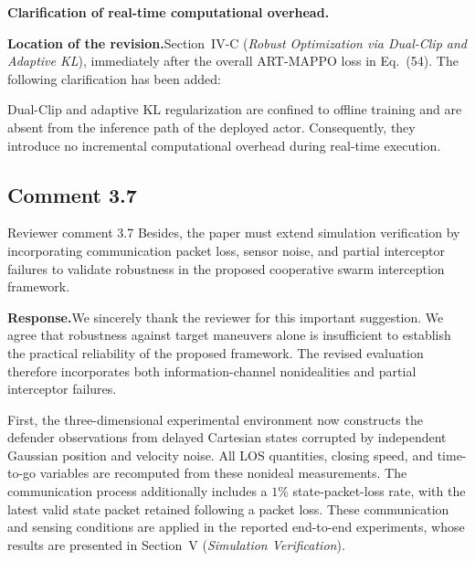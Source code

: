 \documentclass[11pt]{article}
\newcommand{\hladd}[1]{{\color{addblue}#1}}
\newcommand{\rsp}{\medskip\noindent\textbf{Response.}\quad}
\newcommand{\loc}{\medskip\noindent\textbf{Location of the revision.}\quad}
\begin{document}
\medskip
\noindent\textbf{Clarification of real-time computational overhead.}

\loc Section~IV-C (\emph{Robust Optimization via Dual-Clip and Adaptive KL}),
immediately after the overall ART-MAPPO loss in Eq.~(54). The following
clarification has been added:

\begin{tcolorbox}[enhanced,breakable,colback=white,colframe=addblue!55,
boxrule=0.6pt,arc=2pt,left=9pt,right=9pt,top=7pt,bottom=7pt]
\hladd{Dual-Clip and adaptive KL regularization are confined to offline
training and are absent from the inference path of the deployed actor.
Consequently, they introduce no incremental computational overhead during
real-time execution.}
\end{tcolorbox}




\subsection*{Comment 3.7}

\begin{reviewercomment}{Reviewer comment 3.7}
Besides, the paper must extend simulation verification by incorporating
communication packet loss, sensor noise, and partial interceptor failures to
validate robustness in the proposed cooperative swarm interception framework.
\end{reviewercomment}

\rsp We sincerely thank the reviewer for this important suggestion. We agree
that robustness against target maneuvers alone is insufficient to establish
the practical reliability of the proposed framework. The revised evaluation
therefore incorporates both information-channel nonidealities and partial
interceptor failures.

First, the three-dimensional experimental environment now constructs the
defender observations from delayed Cartesian states corrupted by independent
Gaussian position and velocity noise. All LOS quantities, closing speed, and
time-to-go variables are recomputed from these nonideal measurements. The
communication process additionally includes a $1\%$ state-packet-loss rate,
with the latest valid state packet retained following a packet loss. These
communication and sensing conditions are applied in the reported
end-to-end experiments, whose results are presented in Section~V
(\emph{Simulation Verification}).
\end{document}
